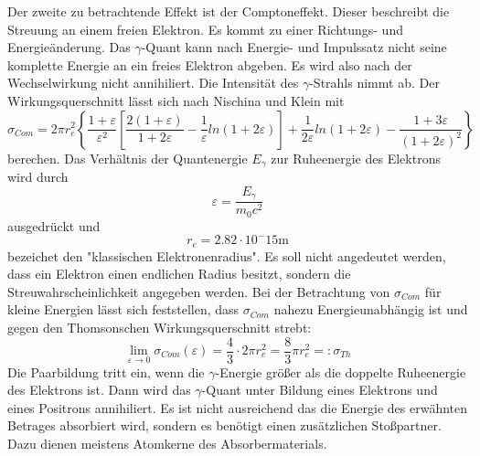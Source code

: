 Der zweite zu betrachtende Effekt ist der Comptoneffekt.
Dieser beschreibt die Streuung an einem freien Elektron.
Es kommt zu einer Richtungs- und Energieänderung.
Das $\gamma$-Quant kann nach Energie- und Impulssatz nicht seine komplette Energie an ein freies Elektron abgeben.
Es wird also nach der Wechselwirkung nicht annihiliert.
Die Intensität des $\gamma$-Strahls nimmt ab.
Der Wirkungsquerschnitt lässt sich nach Nischina und Klein mit
\begin{equation}
    \label{eq:klein}
  \sigma_{Com} = 2 \pi r_e^2 \left\{\frac{1+\varepsilon}{\varepsilon^2}\left[\frac{2(1+\varepsilon)}{1+2\varepsilon} - \frac{1}{\varepsilon}ln(1+2\varepsilon)\right] + \frac{1}{2\varepsilon}ln(1+2\varepsilon) - \frac{1+3\varepsilon}{(1+2\varepsilon)^2} \right\}
\end{equation}
berechen.
Das Verhältnis der Quantenergie $E_\gamma$ zur Ruheenergie des Elektrons wird durch
\begin{equation}
  \varepsilon = \frac{E_\gamma}{m_0 c^2}
\end{equation}
ausgedrückt und
\begin{equation}
  r_e= 2.82 \cdot 10^-15 \si{\meter}
\end{equation}
bezeichet den "klassischen Elektronenradius".
Es soll nicht angedeutet werden, dass ein Elektron einen endlichen Radius besitzt, sondern die Streuwahrscheinlichkeit angegeben werden.
Bei der Betrachtung von $\sigma_{Com}$ für kleine Energien lässt sich feststellen, dass $\sigma_{Com}$ nahezu Energieunabhängig ist und gegen den Thomsonschen Wirkungsquerschnitt strebt:
\begin{equation}
  \lim_{\varepsilon \rightarrow 0} \sigma_{Com}(\varepsilon) = \frac{4}{3} \cdot 2 \pi r_e^2 = \frac{8}{3}\pi r_e^2 =: \sigma_{Th}
\end{equation}
Die Paarbildung tritt ein, wenn die $\gamma$-Energie größer als die doppelte Ruheenergie des Elektrons ist.
Dann wird das $\gamma$-Quant unter Bildung eines Elektrons und eines Positrons annihiliert.
Es ist nicht ausreichend das die Energie des erwähnten Betrages absorbiert wird, sondern es benötigt einen zusätzlichen Stoßpartner.
Dazu dienen meistens Atomkerne des Absorbermaterials.
